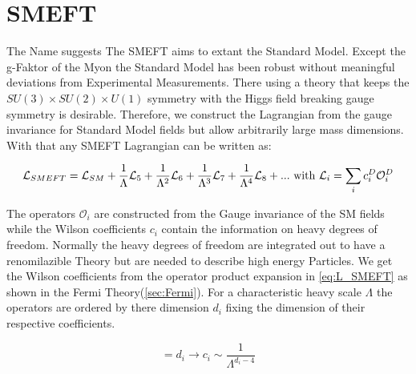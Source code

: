 \documentclass[../Bachelorarbeit.tex]{subfiles}
\begin{document}
\section{SMEFT}
The Name suggests The SMEFT aims to extant the Standard Model.
Except the g-Faktor of the Myon the Standard Model has been robust without meaningful deviations from Experimental Measurements. 
There using a theory that keeps the $SU(3) \times SU(2) \times U(1)$ symmetry with the Higgs field breaking gauge symmetry is desirable.
Therefore, we construct the Lagrangian from the gauge invariance for Standard Model fields but allow arbitrarily large mass dimensions. 
With that any SMEFT Lagrangian can be written as:

\begin{equation}
    \mathcal{L}_{SMEFT} = \mathcal{L}_{SM} + \frac{1}{\Lambda} \mathcal{L}_{5} + \frac{1}{\Lambda^2} \mathcal{L}_{6} + \frac{1}{\Lambda^3} \mathcal{L}_{7} + \frac{1}{\Lambda^4} \mathcal{L}_{8} + ... \textnormal{ with } \mathcal{L}_{i} = \sum_{i} c_{i}^{D} \mathcal{O}_{i}^{D}
    \label{eq:L_SMEFT}
\end{equation}

The operators $\mathcal{O}_{i}$ are constructed from the Gauge invariance of the SM fields while the Wilson coefficients $c_{i}$ contain the information on heavy degrees of freedom.
Normally the heavy degrees of freedom are integrated out to have a renomilazible Theory but are needed to describe high energy Particles.
We get the Wilson coefficients from the operator product expansion in \ref{eq:L_SMEFT} as shown in the Fermi Theory(\ref{sec:Fermi}).
For a characteristic heavy scale $\Lambda$ the operators are ordered by there dimension $d_{i}$ fixing the dimension of their respective coefficients.

\begin{equation}
    [\mathcal{O}_i] = d_{i} \longrightarrow c_{i} \sim \frac{1}{\Lambda^{d_{i}-4}}
\end{equation}
\end{document}
